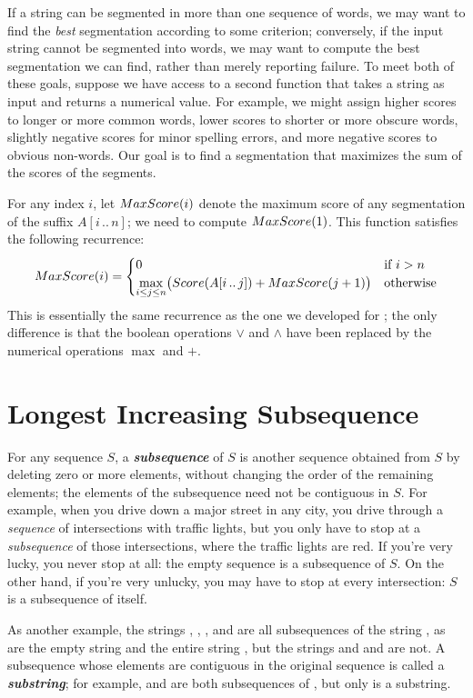 If a string can be segmented in more than one sequence of words, we may want to find the \textit{best} segmentation according to some criterion; conversely, if the input string cannot be segmented into words, we may want to compute the best segmentation we can find, rather than merely reporting failure.
To meet both of these goals, suppose we have access to a second function  that takes a string as input and returns a numerical value.
For example, we might assign higher scores to longer or more common words, lower scores to shorter or more obscure words, slightly negative scores for minor spelling errors, and more negative scores to obvious non-words.
Our goal is to find a segmentation that maximizes the sum of the scores of the segments.

For any index $i$, let $MaxScore(i)$ denote the maximum score of any segmentation of the suffix $A[i\,..\,n]$; we need to compute $MaxScore(1)$.
This function satisfies the following recurrence:
\[
MaxScore(i) = \begin{cases}
0 & \text{if } i > n\\
\displaystyle\max_{i \le j \le n} \bigl(Score(A[i\,..\,j]) + MaxScore(j+1)\bigr) & \text{otherwise}
\end{cases}
\]
This is essentially the same recurrence as the one we developed for ; the only difference is that the boolean operations $\vee$ and $\wedge$ have been replaced by the numerical operations $\max$ and $+$.

\section{Longest Increasing Subsequence}
\label{sec:2.6}

For any sequence $S$, a \textbf{\textit{subsequence}} of $S$ is another sequence obtained from $S$ by deleting zero or more elements, without changing the order of the remaining elements; the elements of the subsequence need not be contiguous in $S$.
For example, when you drive down a major street in any city, you drive through a \textit{sequence} of intersections with traffic lights, but you only have to stop at a \textit{subsequence} of those intersections, where the traffic lights are red.
If you’re very lucky, you never stop at all: the empty sequence is a subsequence of $S$.
On the other hand, if you’re very unlucky, you may have to stop at every intersection: $S$ is a subsequence of itself.

As another example, the strings , , , and  are all subsequences of the string , as are the empty string and the entire string , but the strings  and  and  are not.
A subsequence whose elements are contiguous in the original sequence is called a \textbf{\textit{substring}}; for example,  and  are both subsequences of , but only  is a substring.

